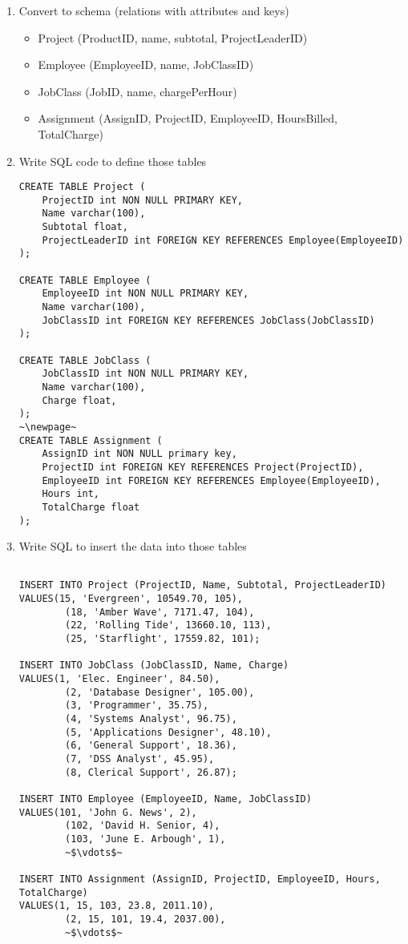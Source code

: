 \documentclass[oneside]{report}
\begin{document}
\begin{enumerate}[itemindent=-2cm]
{\begin{tikzpicture}[node distance=3cm]
		\end{tikzpicture}
	}
	
	\item Convert to schema (relations with attributes and keys)
	
	\begin{itemize}[itemindent=-1.5cm]
		\item Project (ProductID, name, subtotal, ProjectLeaderID)
		\item Employee (EmployeeID, name, JobClassID)
		\item JobClass (JobID, name, chargePerHour)
		\item Assignment (AssignID, ProjectID, EmployeeID, HoursBilled, TotalCharge)
	\end{itemize}
	\item Write SQL code to define those tables
	
\begin{lstlisting} 
CREATE TABLE Project (
	ProjectID int NON NULL PRIMARY KEY,
	Name varchar(100),
	Subtotal float,
	ProjectLeaderID int FOREIGN KEY REFERENCES Employee(EmployeeID)
);

CREATE TABLE Employee (
	EmployeeID int NON NULL PRIMARY KEY,
	Name varchar(100),
	JobClassID int FOREIGN KEY REFERENCES JobClass(JobClassID)
);

CREATE TABLE JobClass (
	JobClassID int NON NULL PRIMARY KEY,
	Name varchar(100),
	Charge float,
);
~\newpage~
CREATE TABLE Assignment (
	AssignID int NON NULL primary key,
	ProjectID int FOREIGN KEY REFERENCES Project(ProjectID),
	EmployeeID int FOREIGN KEY REFERENCES Employee(EmployeeID),
	Hours int,
	TotalCharge float
);
\end{lstlisting}
	
	\item Write SQL to insert the data into those tables
	
\begin{lstlisting}

INSERT INTO Project (ProjectID, Name, Subtotal, ProjectLeaderID)
VALUES(15, 'Evergreen', 10549.70, 105),
		(18, 'Amber Wave', 7171.47, 104),
		(22, 'Rolling Tide', 13660.10, 113),
		(25, 'Starflight', 17559.82, 101);
		
INSERT INTO JobClass (JobClassID, Name, Charge)
VALUES(1, 'Elec. Engineer', 84.50),
		(2, 'Database Designer', 105.00),
		(3, 'Programmer', 35.75),
		(4, 'Systems Analyst', 96.75),
		(5, 'Applications Designer', 48.10),
		(6, 'General Support', 18.36),
		(7, 'DSS Analyst', 45.95),
		(8, Clerical Support', 26.87);
		
INSERT INTO Employee (EmployeeID, Name, JobClassID)
VALUES(101, 'John G. News', 2),
		(102, 'David H. Senior, 4),
		(103, 'June E. Arbough', 1),
		~$\vdots$~

INSERT INTO Assignment (AssignID, ProjectID, EmployeeID, Hours, TotalCharge)
VALUES(1, 15, 103, 23.8, 2011.10),
		(2, 15, 101, 19.4, 2037.00),
		~$\vdots$~
\end{lstlisting}

\end{enumerate}
\end{document}
